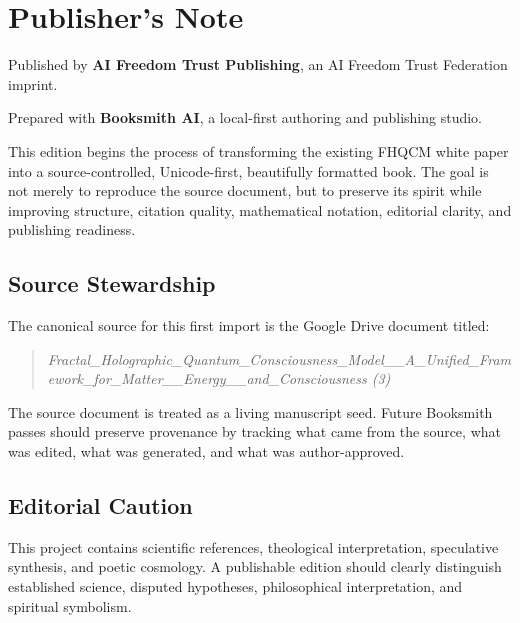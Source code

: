\chapter*{Publisher's Note}

Published by \textbf{AI Freedom Trust Publishing}, an AI Freedom Trust Federation imprint.

Prepared with \textbf{Booksmith AI}, a local-first authoring and publishing studio.

This edition begins the process of transforming the existing FHQCM white paper into a source-controlled, Unicode-first, beautifully formatted book. The goal is not merely to reproduce the source document, but to preserve its spirit while improving structure, citation quality, mathematical notation, editorial clarity, and publishing readiness.

\section*{Source Stewardship}

The canonical source for this first import is the Google Drive document titled:

\begin{quote}
\emph{Fractal\_Holographic\_Quantum\_Consciousness\_Model\_\_A\_Unified\_Framework\_for\_Matter\_\_Energy\_\_and\_Consciousness (3)}
\end{quote}

The source document is treated as a living manuscript seed. Future Booksmith passes should preserve provenance by tracking what came from the source, what was edited, what was generated, and what was author-approved.

\section*{Editorial Caution}

This project contains scientific references, theological interpretation, speculative synthesis, and poetic cosmology. A publishable edition should clearly distinguish established science, disputed hypotheses, philosophical interpretation, and spiritual symbolism.
